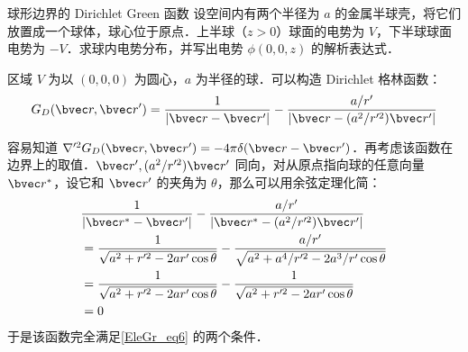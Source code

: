\begin{example}{球形边界的 Dirichlet Green 函数}
设空间内有两个半径为 $a$ 的金属半球壳，将它们放置成一个球体，球心位于原点．上半球（$z>0$）球面的电势为 $V$，下半球球面电势为 $-V$．求球内电势分布，并写出电势 $\phi(0,0,z)$ 的解析表达式．

区域 $V$ 为以 $(0,0,0)$ 为圆心，$a$ 为半径的球．可以构造 Dirichlet 格林函数：
\begin{equation}
G_D(\bvec r,\bvec r')=\frac{1}{|\bvec r-\bvec r'|}-\frac{a/r'}{|\bvec r-(a^2/r'^2)\bvec r'|}
\end{equation}

容易知道 $\nabla'^2G_D(\bvec r,\bvec r')=-4\pi\delta(\bvec r-\bvec r')$．再考虑该函数在边界上的取值．$\bvec r',(a^2/r'^2)\bvec r'$ 同向，对从原点指向球的任意向量 $\bvec r^*$，设它和 $\bvec r'$ 的夹角为 $\theta$，那么可以用余弦定理化简：
\begin{equation}
\begin{aligned}
&\frac{1}{|\bvec r^*-\bvec r'|}-\frac{a/r'}{|\bvec r^*-(a^2/r'^2)\bvec r'|}
\\&=\frac{1}{\sqrt{a^2+r'^2-2ar'\cos\theta}}-\frac{a/r'}{\sqrt{a^2+a^4/r'^2-2a^3/r'\cos\theta}}
\\&=\frac{1}{\sqrt{a^2+r'^2-2ar'\cos\theta}}-\frac{1}{\sqrt{a^2+r'^2-2ar'\cos\theta}}
\\&=0
\end{aligned}
\end{equation}
于是该函数完全满足\autoref{EleGr_eq6} 的两个条件．


\end{example}
